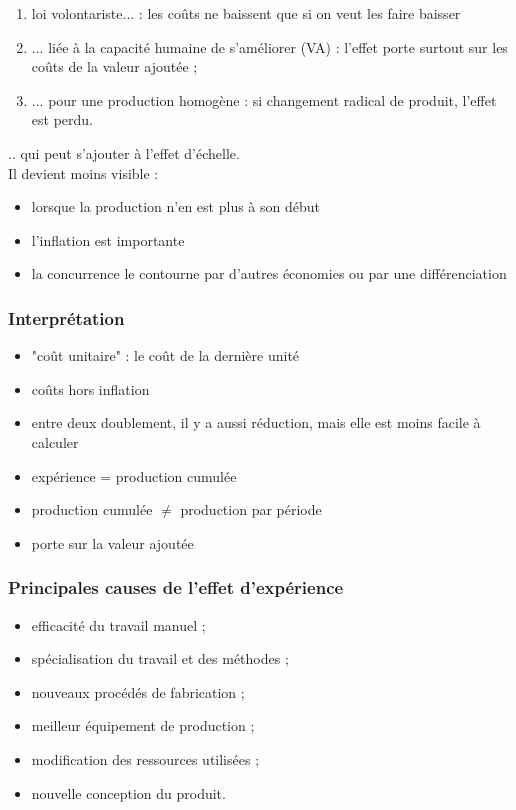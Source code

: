 		\begin{enumerate}
			\item loi volontariste... : les coûts ne baissent que si on veut les faire baisser
			\item ... liée à la capacité humaine de s'améliorer (VA) : l'effet porte surtout sur les coûts de la valeur ajoutée ;
			\item ... pour une production homogène : si changement radical de produit, l'effet est perdu.
		\end{enumerate}
		.. qui peut s'ajouter à l'effet d'échelle. \\
		
		Il devient moins visible :
		
		\begin{itemize}
			\item lorsque la production n'en est plus à son début
			\item l'inflation est importante
			\item la concurrence le contourne par d'autres économies ou par une différenciation
		\end{itemize}
		
		
			\subsubsection{Interprétation}
		
		\begin{itemize}
			\item "coût unitaire" : le coût de la dernière unité
			\item coûts hors inflation
			\item entre deux doublement, il y a aussi réduction, mais elle est moins facile à calculer
			\item expérience = production cumulée
			\item production cumulée $\neq$ production par période
			\item porte sur la valeur ajoutée
		\end{itemize}
		
			\subsubsection{Principales causes de l'effet d'expérience}
		
		\begin{itemize}
			\item efficacité du travail manuel ;
			\item spécialisation du travail et des méthodes ;
			\item nouveaux procédés de fabrication ;
			\item meilleur équipement de production ;
			\item modification des ressources utilisées ;
			\item nouvelle conception du produit.
		\end{itemize}
		
